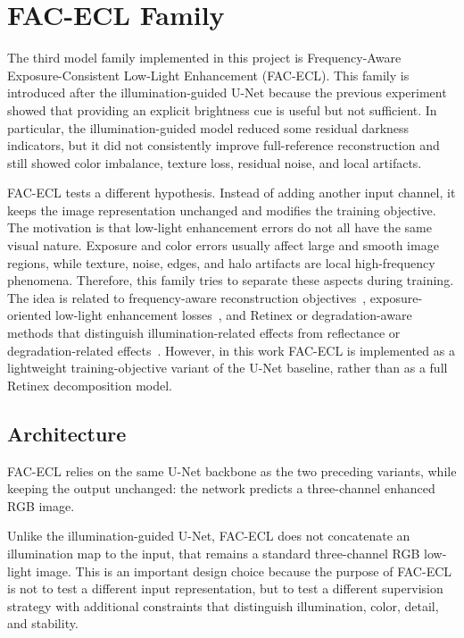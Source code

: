 \section{FAC-ECL Family}

The third model family implemented in this project is Frequency-Aware Exposure-Consistent Low-Light Enhancement (FAC-ECL). This family is introduced after the illumination-guided U-Net because the previous experiment showed that providing an explicit brightness cue is useful but not sufficient. In particular, the illumination-guided model reduced some residual darkness indicators, but it did not consistently improve full-reference reconstruction and still showed color imbalance, texture loss, residual noise, and local artifacts.

FAC-ECL tests a different hypothesis. Instead of adding another input channel, it keeps the image representation unchanged and modifies the training objective. The motivation is that low-light enhancement errors do not all have the same visual nature. Exposure and color errors usually affect large and smooth image regions, while texture, noise, edges, and halo artifacts are local high-frequency phenomena. Therefore, this family tries to separate these aspects during training. The idea is related to frequency-aware reconstruction objectives~\cite{DBLP:conf/iccv/JiangDWL21}, exposure-oriented low-light enhancement losses~\cite{DBLP:conf/cvpr/GuoLGLHKC20}, and Retinex or degradation-aware methods that distinguish illumination-related effects from reflectance or degradation-related effects~\cite{DBLP:conf/bmvc/WeiWY018, DBLP:journals/dsp/WeiLL24}. However, in this work FAC-ECL is implemented as a lightweight training-objective variant of the U-Net baseline, rather than as a full Retinex decomposition model.

\subsection{Architecture}

FAC-ECL relies on the same U-Net backbone as the two preceding variants, while keeping the output unchanged: the network predicts a three-channel enhanced RGB image.

Unlike the illumination-guided U-Net, FAC-ECL does not concatenate an illumination map to the input, that remains a standard three-channel RGB low-light image. This is an important design choice because the purpose of FAC-ECL is not to test a different input representation, but to test a different supervision strategy with additional constraints that distinguish illumination, color, detail, and stability.

